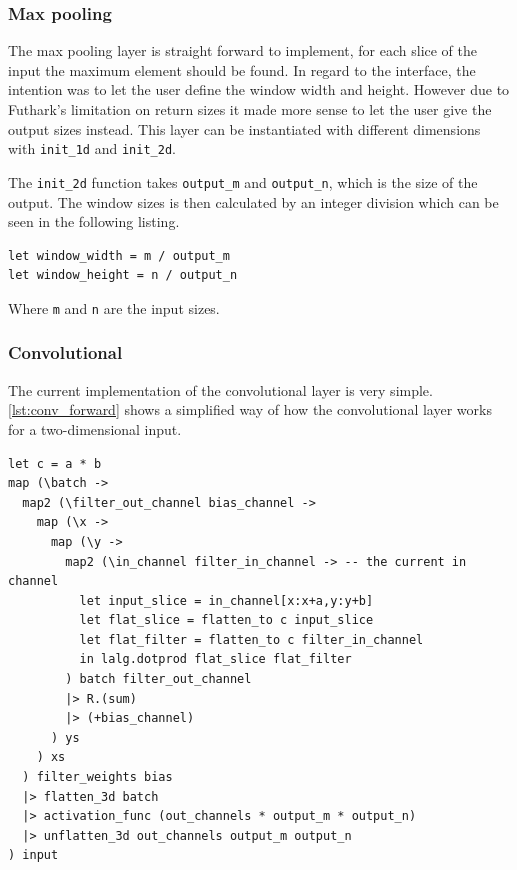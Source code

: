 \subsubsection{Max pooling}
\label{ssub:impl_max_pool}

The max pooling layer is straight forward to implement, for each slice of the input the maximum element should be found.
In regard to the interface, the intention was to let the user define the window width and height.
However due to Futhark's limitation on return sizes it made more sense to let the user give the output sizes instead.
This layer can be instantiated with different dimensions with \texttt{init\_1d} and \texttt{init\_2d}.

The \texttt{init\_2d} function takes \texttt{output\_m} and \texttt{output\_n}, which is the size of the output.
The window sizes is then calculated by an integer division which can be seen in the following listing.
\begin{lstlisting}
let window_width = m / output_m
let window_height = n / output_n
\end{lstlisting}
Where \texttt{m} and \texttt{n} are the input sizes.

\subsubsection{Convolutional}
\label{ssub:impl_conv}

The current implementation of the convolutional layer is very simple. \autoref{lst:conv_forward} shows a simplified way of how the convolutional layer works for a two-dimensional input.

\begin{lstlisting}[label={lst:conv_forward}, caption=A simplified forward function for the 2d convolutional layer. Where \texttt{a} and \texttt{b} are the sizes of the kernel.]
let c = a * b
map (\batch ->
  map2 (\filter_out_channel bias_channel ->
    map (\x ->
      map (\y ->
        map2 (\in_channel filter_in_channel -> -- the current in channel
          let input_slice = in_channel[x:x+a,y:y+b]
          let flat_slice = flatten_to c input_slice
          let flat_filter = flatten_to c filter_in_channel
          in lalg.dotprod flat_slice flat_filter
        ) batch filter_out_channel
        |> R.(sum)
        |> (+bias_channel)
      ) ys
    ) xs
  ) filter_weights bias
  |> flatten_3d batch
  |> activation_func (out_channels * output_m * output_n)
  |> unflatten_3d out_channels output_m output_n
) input
\end{lstlisting}

